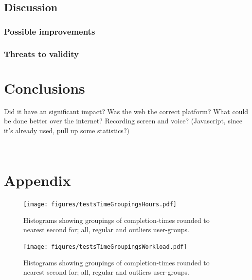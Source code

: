 \documentclass[nofilelist,dvipsnames]{cslthse-msc}
\begin{document}
		\section{Discussion}

			\subsection{Possible improvements}

			\subsection{Threats to validity}





	\chapter{Conclusions}

		Did it have an significant impact? Was the web the correct platform? What
		could be done better over the internet? Recording screen and voice?
		(Javascript, since it's already used, pull up some statistics?)


	\checkoddpage
	\ifoddpage
	\else
		 \newpage
		 \thispagestyle{empty}
		 \mbox{ }
	\fi

  \chapter{Appendix}


        \begin{figure}[h!]
          \centering
          \texttt{[image: figures/testsTimeGroupingsHours.pdf]}
          \caption{
            Histograms showing groupings of completion-times rounded to nearest
            second for; all, regular and outliers user-groups.
          }
        \end{figure}

        \begin{figure}[h!]
          \centering
          \texttt{[image: figures/testsTimeGroupingsWorkload.pdf]}
          \caption{
            Histograms showing groupings of completion-times rounded to nearest
            second for; all, regular and outliers user-groups.
          }
        \end{figure}
\end{document}
